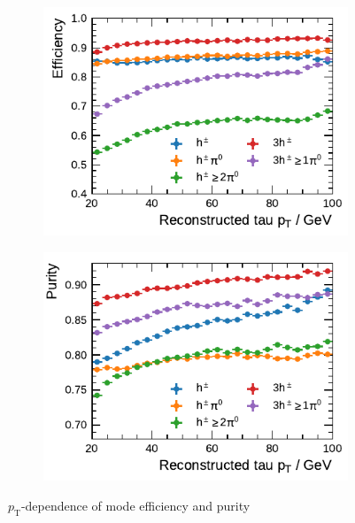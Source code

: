 \begin{figure}[!ht]
  \begin{subfigure}{0.48\textwidth}
    \centering
    \includegraphics{./figures/decay_mode_classification/combined_sub_e_moments_shots_conv_ptcut_1_5/efficiency_profile.pdf}
  \end{subfigure}\hfill
  \begin{subfigure}{0.48\textwidth}
    \centering
    \includegraphics{./figures/decay_mode_classification/combined_sub_e_moments_shots_conv_ptcut_1_5/purity_profile.pdf}
  \end{subfigure}
  \caption{$p_\text{T}$-dependence of mode efficiency and purity}
  \label{fig:mode_efficiency_purity}
\end{figure}

